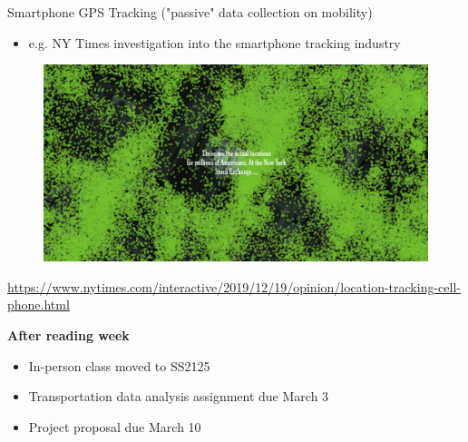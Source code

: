 \documentclass[aspectratio=169]{beamer}
\begin{document}
\begin{frame}
	
	Smartphone GPS Tracking ("passive" data collection on mobility)
	
	\begin{itemize}
		\item e.g. NY Times investigation into the smartphone tracking industry
	\end{itemize}
	
	
	\begin{figure}
		\centering
		\includegraphics[width=0.8\linewidth]{images/nytimes_gps_stockexchange.png}
	\end{figure}
	\tiny\url{https://www.nytimes.com/interactive/2019/12/19/opinion/location-tracking-cell-phone.html}
	
\end{frame}





\begin{frame}
	
	\textbf{After reading week}
	
	\begin{itemize}
		\item In-person class moved to SS2125
		\item Transportation data analysis assignment due March 3
		\item Project proposal due March 10
	\end{itemize}
	
\end{frame}
\end{document}
